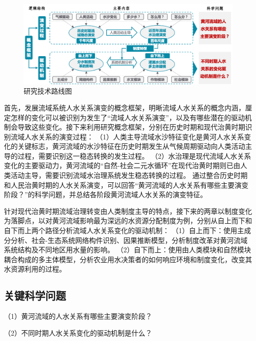 \begin{figure}[htb] %
    \includegraphics[width=\textwidth]{img/ch1/ch1_workflow.png}
    \caption{研究技术路线图}\label{ch1:fig:workflow}
\end{figure}

首先，发展流域系统人水关系演变的概念框架，明晰流域人水关系的概念内涵，厘定怎样的变化可以被识别为发生了“流域人水关系演变”，以及有哪些潜在的驱动机制会导致这些变化。接下来利用研究概念框架，分别在历史时期和现代治黄时期识别流域人水关系的演变过程：
（1）人类主导流域水沙特征变化是黄河人水关系变化的关键标志，黄河流域的水沙特征在历史时期发生从气候周期驱动向人类活动主导的过程，需要识别这一稳态转换的发生过程。
（2）水治理是现代流域人水关系变化的主要驱动力，黄河流域的“自然-社会二元水循环”在现代治黄时期则已由人类活动主导，需要识别流域水治理系统发生稳态转换的过程。
通过整合历史时期和人民治黄时期的人水关系演变，可以回答“黄河流域的人水关系有哪些主要演变阶段？”的科学问题，并总结各阶段黄河流域人水关系的演变特征。

针对现代治黄时期流域治理转变由人类制度主导的特点，接下来的两章以制度变化为落脚点，以对黄河流域影响最为深远的水资源分配制度为例，分别从自上而下和自下而上两个路径分析流域人水关系变化的驱动机制：
（1）自上而下：使用主成分分析、社会-生态系统网络构件识别、因果推断模型，分析制度改革对黄河流域系统结构及不同地区用水量的影响。
（2）自下而上：使用由人类模块和自然模块耦合构成的多主体模型，分析农业用水决策者的如何响应环境和制度变化，改变其水资源利用的过程。

\subsection{关键科学问题}

（1）黄河流域的人水关系有哪些主要演变阶段？

（2）不同时期人水关系变化的驱动机制是什么？
